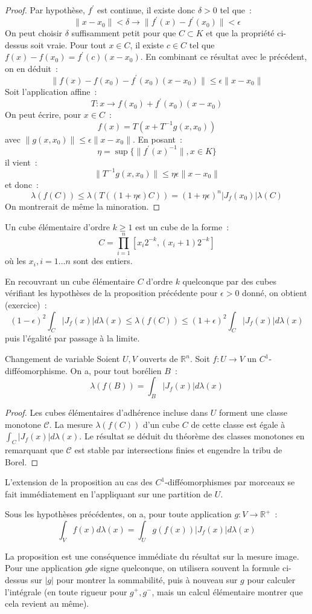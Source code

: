 \begin{proof}
Par hypothèse, $f^\prime$ est continue, il existe donc $\delta > 0$
tel que~:
\[
\| x - x_0 \| < \delta \rightarrow \| f^\prime(x) - f^\prime(x_0) \| < \epsilon
\]
On peut choisir $\delta$ suffisamment petit pour que  $C \subset K$
et que la propriété ci-dessus soit vraie. 
Pour tout $x \in C$, il existe $c \in C$ tel que $f(x) - f(x_0) =
f^\prime(c) (x-x_0)$. En combinant ce résultat avec le précédent, on
en déduit~:
\[
\| f(x) - f(x_0) - f^\prime(x_0)(x-x_0)\| \leq \epsilon \|x-x_0\|
\]
Soit l'application affine~:
\[
T : x \to f(x_0)+f^\prime(x_0)(x-x_0)
\]
On peut écrire, pour $x \in C$~:
\[
f(x) = T(x + T^{-1}g(x,x_0))
\]
avec $\| g(x,x_0) \| \leq \epsilon \|x -x_0\|$.
En posant~:
\[
\eta = \sup \{ \| f^{\prime}(x)^{-1} \|, x \in K \}
\]
il vient~:
\[
\|  T^{-1}g(x,x_0) \| \leq \eta \epsilon \| x - x_0 \|
\]
et donc~:
\[
\lambda(f(C)) \leq \lambda(T((1+\eta \epsilon )C)) =
(1+\eta\epsilon)^n |J_f(x_0)| \lambda(C)
\]
On montrerait de même la minoration.
\end{proof}
\begin{defn}
Un cube élémentaire d'ordre $k \geq 1$ est un cube de la forme~:
\[
C = \prod_{i=1}^n [ x_i 2^{-k}, (x_i + 1)2^{-k} ]
\]
où les $x_i, i=1\dots n$ sont des entiers.
\end{defn}
En recouvrant un cube élémentaire $C$ d'ordre $k$ quelconque par des
cubes vérifiant les hypothèses de la proposition précédente pour
$\epsilon > 0$ donné, on obtient (exercice)~:
\[
(1-\epsilon)^2 \int_{C} |J_f(x)|d \lambda(x) \leq \lambda(f(C)) \leq
(1+\epsilon)^2 \int_{C} |J_f(x)| d \lambda(x)
\]
puis l'égalité par passage à la limite. 
\begin{prop} Changement de variable
Soient $U,V$ ouverts de $\mathbb{R}^n$. Soit $f : U \to V$ un
$C^1$-difféomorphisme. On a, pour tout borélien $B$~:
\[
\lambda(f(B)) = \int_B |J_f(x) |d \lambda(x)
\]
\end{prop}
\begin{proof}
Les cubes élémentaires d'adhérence incluse dans $U$ forment une
classe monotone $\mathcal{C}$. La mesure  $\lambda(f(C))$ d'un cube
$C$ de cette classe est égale à $ \int_C |J_f(x) |d \lambda(x)$. Le
résultat se déduit du théorème des classes monotones en remarquant que
$\mathcal{C}$ est stable par intersections finies et engendre la tribu
de Borel.
\end{proof}
\begin{rem}
 L'extension de la proposition au cas des $C^1$-difféo\-morphismes par
morceaux se fait immédiatement en l'appliquant sur une partition de
$U$.
\end{rem}
\begin{prop}
Sous les hypothèses précédentes, on a, pour toute application $g : V
\to \mathbb{R}^+$~:
\[
\int_V f(x) d \lambda(x) = \int_U g(f(x)) |J_f(x)| d \lambda(x)
\]
\end{prop}
\begin{rem}
La proposition est une conséquence immédiate du résultat sur la mesure
image. Pour une application $g$de signe quelconque, on utilisera souvent
la formule ci-dessus sur $|g|$ pour montrer la sommabilité, puis à
nouveau sur $g$ pour calculer l'intégrale (en toute rigueur pour
$g^+,g^-$, mais un calcul élémentaire montrer que cela revient au même).
\end{rem}
